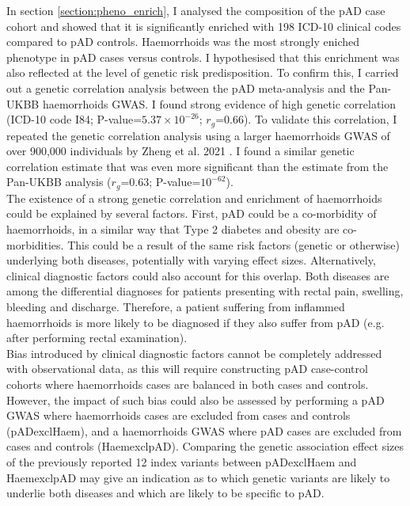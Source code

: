   In section \ref{section:pheno_enrich}, I analysed the composition of the pAD case cohort and showed that it is significantly enriched with 198 ICD-10 clinical codes compared to pAD controls. Haemorrhoids was the most strongly eniched phenotype in pAD cases versus controls. I hypothesised that this enrichment was also reflected at the level of genetic risk predisposition. To confirm this, I carried out a genetic correlation analysis between the pAD meta-analysis and the Pan-UKBB haemorrhoids GWAS. I found strong evidence of high genetic correlation (ICD-10 code I84; P-value=$5.37\times10^{-26}$; $r_{g}$=0.66). To validate this correlation, I repeated the genetic correlation analysis using a larger haemorrhoids GWAS of over 900,000 individuals by Zheng et al. 2021 \cite{Zheng2021-ss}. I found a similar genetic correlation estimate that was even more significant than the estimate from the Pan-UKBB analysis ($r_{g}$=0.63; P-value=$10^{-62}$).\\
  

  The existence of a strong genetic correlation and enrichment of haemorrhoids could be explained by several factors. First, pAD could be a co-morbidity of haemorrhoids, in a similar way that Type 2 diabetes and obesity are co-morbidities. This could be a result of the same risk factors (genetic or otherwise) underlying both diseases, potentially with varying effect sizes. Alternatively, clinical diagnostic factors could also account for this overlap. Both diseases are among the differential diagnoses for patients presenting with rectal pain, swelling, bleeding and discharge. Therefore, a patient suffering from inflammed haemorrhoids is more likely to be diagnosed if they also suffer from pAD (e.g. after performing rectal examination). \\ 

Bias introduced by clinical diagnostic factors cannot be completely addressed with observational data, as this will require constructing pAD case-control cohorts where haemorrhoids cases are  balanced in both cases and controls. However, the impact of such bias could also be assessed by performing a pAD GWAS where haemorrhoids cases are excluded from cases and controls (pADexclHaem), and a haemorrhoids GWAS where pAD cases are excluded from cases and controls (HaemexclpAD). Comparing the genetic association effect sizes of the previously reported 12 index variants between pADexclHaem and HaemexclpAD may give an indication as to which genetic variants are likely to underlie both diseases and which are likely to be specific to pAD. \\

